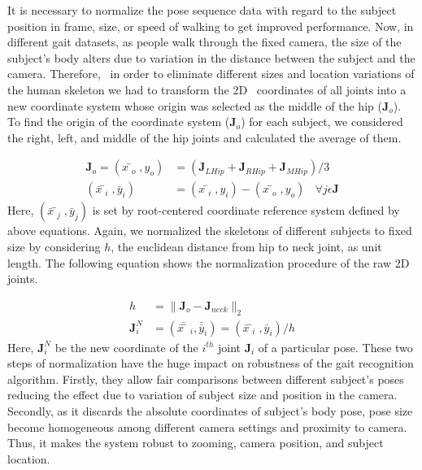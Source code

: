 It is necessary to normalize the pose sequence data with regard to the subject position in frame, size, or speed of walking to get improved performance. Now, in different gait datasets, as people walk through the fixed camera, the size of the subject's body alters due to variation in the distance between the subject and the camera. Therefore,  in order to eliminate different sizes and location variations of the human skeleton we had to transform the 2D  coordinates of all joints into a new coordinate system whose origin was selected as the middle of the hip ($\mathbf{J}_{o}$). To find the origin of the coordinate system ($\mathbf{J}_{o}$) for each subject, we considered the right, left, and middle of the hip joints and calculated the average of them. 

\begin{equation} 
\begin{split}
\mathbf{J}_{o} = {(x̄_{o} , y_{o})} &= {(\mathbf{J}_{LHip} +\mathbf{J}_{RHip} +\mathbf{J}_{MHip})} / {3} \\
(\bar{x}̄_{i} , \bar{y}_{i}) & = {(x̄_{i} , y_{i})} - {(x̄_{o} , y_{o})}~~~~\forall j \epsilon \mathbf{J}
\end{split}
\end{equation}
Here, $(\bar{x}̄_{j} , \bar{y}_{j})$ is set by root-centered coordinate reference system defined by above equations. Again, we normalized the skeletons of different subjects to fixed size by considering $ h $, the euclidean distance from hip to neck joint, as unit length. The following equation shows the normalization procedure of the raw 2D joints.


\begin{equation} \label{equ:normalization_raw_joint}
\begin{split}
	h &= \parallel \mathbf{J}_{o} - \mathbf{J}_{neck} \parallel_2  \\
	\mathbf{J}_{i}^{N} &= (\bar{\bar{x}̄}_{i} , \bar{\bar{y}}_{i}) = (\bar{x}̄_{i} , \bar{y}_{i}) / h 
\end{split}
\end{equation}
Here, $\mathbf{J}_{i}^N$ be the new coordinate of the $i^{th}$ joint $\mathbf{J}_{i}$ of a particular pose. These two steps of normalization have the huge impact on robustness of the gait recognition algorithm. Firstly, they allow fair comparisons between different subject's poses reducing the effect due to variation of subject size and position in the camera. Secondly, as it discards the absolute coordinates of subject's body pose, pose size become homogeneous among different camera settings and proximity to camera. Thus, it makes the system robust to zooming, camera position, and subject location. 



